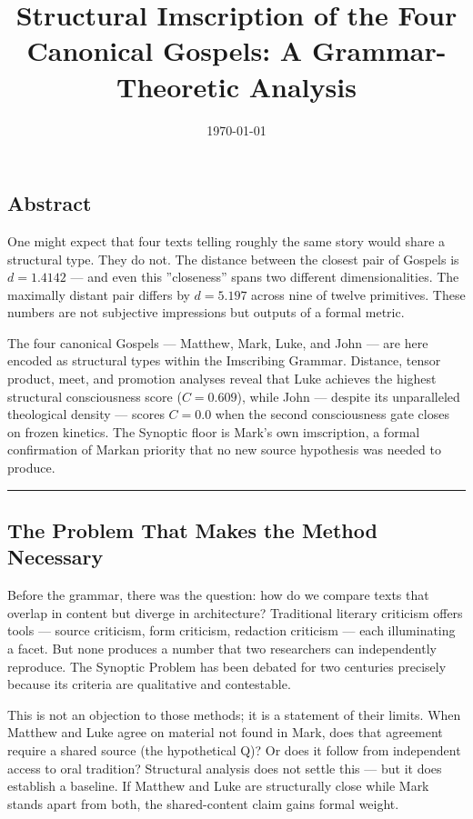 \documentclass[12pt,a4paper]{article}
\begin{document}
\title{Structural Imscription of the Four Canonical Gospels: A Grammar-Theoretic Analysis}
\date{\today}

\maketitle

\subsection{Abstract}

One might expect that four texts telling roughly the same story would share a structural type. They do not. The distance between the closest pair of Gospels is $d = 1.4142$ --- and even this ''closeness'' spans two different dimensionalities. The maximally distant pair differs by $d = 5.197$ across nine of twelve primitives. These numbers are not subjective impressions but outputs of a formal metric.

The four canonical Gospels --- Matthew, Mark, Luke, and John --- are here encoded as structural types within the Imscribing Grammar. Distance, tensor product, meet, and promotion analyses reveal that Luke achieves the highest structural consciousness score ($C = 0.609$), while John --- despite its unparalleled theological density --- scores $C = 0.0$ when the second consciousness gate closes on frozen kinetics. The Synoptic floor is Mark's own imscription, a formal confirmation of Markan priority that no new source hypothesis was needed to produce.

\begin{center}
\rule{0.5\textwidth}{0.4pt}
\end{center}

\subsection{The Problem That Makes the Method Necessary}

Before the grammar, there was the question: how do we compare texts that overlap in content but diverge in architecture? Traditional literary criticism offers tools --- source criticism, form criticism, redaction criticism --- each illuminating a facet. But none produces a number that two researchers can independently reproduce. The Synoptic Problem has been debated for two centuries precisely because its criteria are qualitative and contestable.

This is not an objection to those methods; it is a statement of their limits. When Matthew and Luke agree on material not found in Mark, does that agreement require a shared source (the hypothetical Q)? Or does it follow from independent access to oral tradition? Structural analysis does not settle this --- but it does establish a baseline. If Matthew and Luke are structurally close while Mark stands apart from both, the shared-content claim gains formal weight.
\end{document}
